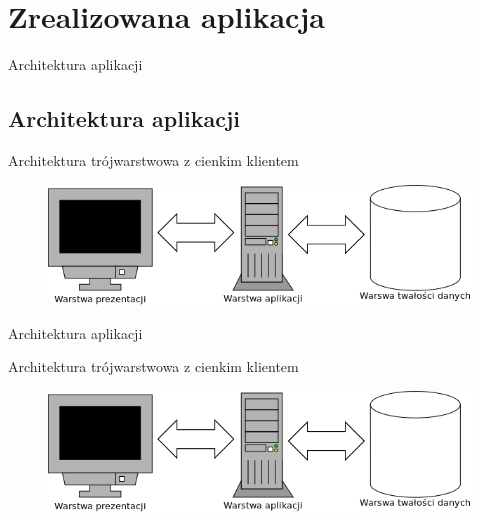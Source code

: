\documentclass[10pt,utf8]{beamer}
\begin{document}
\section{Zrealizowana aplikacja}


\begin{frame}{Architektura aplikacji}
\subsection{Architektura aplikacji}
	\begin{center}
    Architektura trójwarstwowa z cienkim klientem
   \end{center} 	
	\begin{figure}[h]
    \begin{center}
    \includegraphics[angle=0,scale=0.4]{warstwy.png}
    \end{center} 
	\end{figure}
\vspace{\baselineskip}
\end{frame}


\begin{frame}{Architektura aplikacji}
	\begin{center}
    Architektura trójwarstwowa z cienkim klientem
   \end{center} 	
	\begin{figure}[h]
    \begin{center}
    \includegraphics[angle=0,scale=0.4]{warstwy.png}
    \end{center} 
	\end{figure}
\vspace{\baselineskip}
\end{frame}
\end{document}
